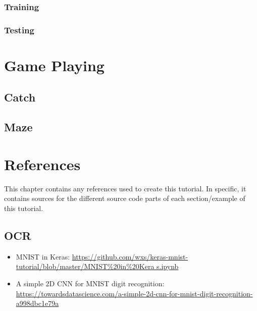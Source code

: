 \documentclass[10pt,twoside,a4paper,openany]{memoir}
\renewcommand*{\printchaptertitle}[1]{\vspace{-2.5cm}\chaptitlefont\thechapter.\ ##1\vspace{-1cm}}
\begin{document}
\subsection{Training}


\subsection{Testing}


\chapter{Game Playing}
\section{Catch}


\newpage
\section{Maze}


\backmatter

\renewcommand*{\printchaptertitle}[1]{\chaptitlefont#1}
\chapter*{References}
This chapter contains any references used to create this tutorial.
In specific, it contains sources for the different source
code parts of each section/example of this tutorial.

\section{OCR}
\begin{itemize}
\item MNIST in Keras: \href{https://github.com/wxs/keras-mnist-tutorial/blob/master/MNIST\%20in\%20Keras.ipynb}{https://github.com/wxs/keras-mnist-tutorial/blob/master/MNIST\%20in\%20Kera s.ipynb}
\item A simple 2D CNN for MNIST digit recognition: \href{https://towardsdatascience.com/a-simple-2d-cnn-for-mnist-digit-recognition-a998dbc1e79a}{https://towardsdatascience.com/a-simple-2d-cnn-for-mnist-digit-recognition-a998dbc1e79a}
\end{itemize}
\end{document}
